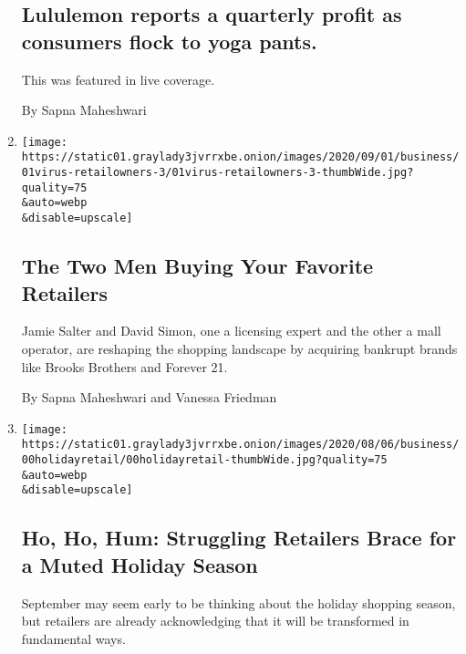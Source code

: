 \begin{enumerate}
  \hypertarget{lululemon-reports-a-quarterly-profit-as-consumers-flock-to-yoga-pants}{%
  \subsection{Lululemon reports a quarterly profit as consumers flock to
  yoga
  pants.}\label{lululemon-reports-a-quarterly-profit-as-consumers-flock-to-yoga-pants}}

  This was featured in live coverage.

  By Sapna Maheshwari
\item
  \href{/2020/09/08/business/retail-bankruptcy-authentic-brands.html}{}

  \texttt{[image: https://static01.graylady3jvrrxbe.onion/images/2020/09/01/business/01virus-retailowners-3/01virus-retailowners-3-thumbWide.jpg?quality=75\\\&auto=webp\\\&disable=upscale]}

  \hypertarget{the-two-men-buying-your-favorite-retailers}{%
  \subsection{The Two Men Buying Your Favorite
  Retailers}\label{the-two-men-buying-your-favorite-retailers}}

  Jamie Salter and David Simon, one a licensing expert and the other a
  mall operator, are reshaping the shopping landscape by acquiring
  bankrupt brands like Brooks Brothers and Forever 21.

  By Sapna Maheshwari and Vanessa Friedman
\item
  \href{/2020/09/02/business/retailers-holiday-shopping.html}{}

  \texttt{[image: https://static01.graylady3jvrrxbe.onion/images/2020/08/06/business/00holidayretail/00holidayretail-thumbWide.jpg?quality=75\\\&auto=webp\\\&disable=upscale]}

  \hypertarget{ho-ho-hum-struggling-retailers-brace-for-a-muted-holiday-season}{%
  \subsection{Ho, Ho, Hum: Struggling Retailers Brace for a Muted
  Holiday
  Season}\label{ho-ho-hum-struggling-retailers-brace-for-a-muted-holiday-season}}

  September may seem early to be thinking about the holiday shopping
  season, but retailers are already acknowledging that it will be
  transformed in fundamental ways.


\end{enumerate}
